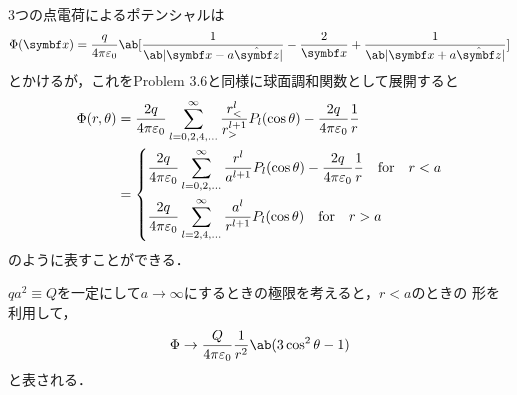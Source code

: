   \hrulefill\\
  3つの点電荷によるポテンシャルは
  \begin{gather}%
    \Phi(\bs{x}) = \frac{q}{4\pi \eps_0} \ab[
      \frac{1}{\ab|\bs{x} - a\hat{\bs{z}}|} - \frac{2}{\bs{x}} + \frac{1}{\ab|\bs{x} + a \hat{\bs{z}}|}
    ]
  \end{gather}%
  とかけるが，これをProblem 3.6と同様に球面調和関数として展開すると
  \begin{align}%
    \Phi(r, \theta) &= \frac{2q}{4\pi \eps_0} \sum_{l = 0, 2, 4, \ldots}^{\infty} \frac{r_<^l}{r_>^{l+1}} P_l(\cos\theta) - \frac{2q}{4\pi\eps_0}\frac{1}{r}\notag\\
    &= 
    \begin{dcases}%
      \frac{2q}{4\pi\eps_0} \sum_{l=0,2,\ldots}^\infty \frac{r^l}{a^{l+1}} P_l(\cos\theta) - \frac{2q}{4\pi\eps_0} \frac{1}{r}\qqtext{for} r < a\\
      \frac{2q}{4\pi\eps_0} \sum_{l=2, 4, \ldots}^\infty \frac{a^l}{r^{l+1}} P_l(\cos\theta)
      \qqtext{for} r > a
    \end{dcases}%
  \end{align}%
  のように表すことができる．
  
$qa^2 \equiv Q$を一定にして$a \to \infty$にするときの極限を考えると，$r<a$のときの
形を利用して，
\begin{gather}%
  \Phi \to \frac{Q}{4\pi \eps_0} \frac{1}{r^2} \ab(3\cos^2 \theta - 1)
\end{gather}%
と表される．

